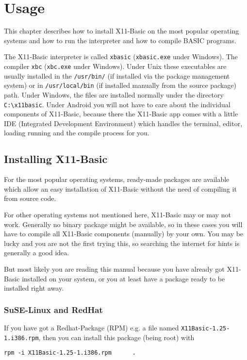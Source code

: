 \chapter{Usage}

This chapter describes how to install X11-Basic on the most popular operating 
systems and how to run the interpreter and how to compile BASIC programs.

The X11-Basic interpreter is called \verb|xbasic| (\verb|xbasic.exe| under 
Windows). The compiler \verb|xbc| (\verb|xbc.exe| under  Windows). Under Unix
these executables are usually installed in the \verb|/usr/bin/| (if installed
via  the package management system) or in \verb|/usr/local/bin|  (if installed
manually from the source package) path. Under Windows, the files are installed
normally under the directory \verb|C:\x11basic|. Under Android you will not have
to care about the individual components of X11-Basic,  because there the
X11-Basic app comes with a little IDE  (Integrated Development Environment)
which handles the terminal, editor, loading running and the compile process 
for you.

\section{Installing X11-Basic}

For the most popular operating systems, ready-made packages are  available which
allow an easy installation of X11-Basic without the  need of compiling it from
source code. 

For other operating systems not mentioned here, X11-Basic may or may not work. 
Generally no binary package might be available, so in these cases you will have 
to compile all X11-Basic components (manually) by your own. You may be lucky 
and you are not the first trying this, so searching the internet for hints is 
generally a good idea.

But most likely you are reading this manual because you have already got 
X11-Basic installed on your system, or you at least have a package ready 
to be installed right away.

\subsection*{SuSE-Linux and RedHat}

If you have got a Redhat-Package (RPM) e.g. a file named 
\verb|X11Basic-1.25-1.i386.rpm|, then you can install this package (being
root) with 
\begin{verbatim}
rpm -i X11Basic-1.25-1.i386.rpm      .
\end{verbatim}


